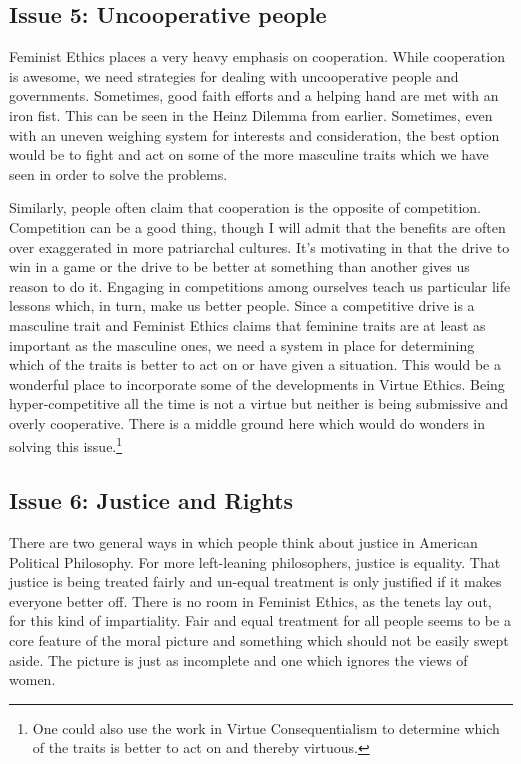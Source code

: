 \subsection{Issue 5: Uncooperative people}

Feminist Ethics places a very heavy emphasis on cooperation. While cooperation is awesome, we need strategies for dealing with uncooperative people and governments. Sometimes, good faith efforts and a helping hand are met with an iron fist. This can be seen in the Heinz Dilemma from earlier. Sometimes, even with an uneven weighing system for interests and consideration, the best option would be to fight and act on some of the more masculine traits which we have seen in order to solve the problems. 

Similarly, people often claim that cooperation is the opposite of competition. Competition can be a good thing, though I will admit that the benefits are often over exaggerated in more patriarchal cultures. It’s motivating in that the drive to win in a game or the drive to be better at something than another gives us reason to do it. Engaging in competitions among ourselves teach us particular life lessons which, in turn, make us better people. Since a competitive drive is a masculine trait and Feminist Ethics claims that feminine traits are at least as important as the masculine ones, we need a system in place for determining which of the traits is better to act on or have given a situation. This would be a wonderful place to incorporate some of the developments in Virtue Ethics. Being hyper-competitive all the time is not a virtue but neither is being submissive and overly cooperative. There is a middle ground here which would do wonders in solving this issue.\footnote{One could also use the work in Virtue Consequentialism to determine which of the traits is better to act on and thereby virtuous.}

\subsection{Issue 6: Justice and Rights}

There are two general ways in which people think about justice in American Political Philosophy. For more left-leaning philosophers, justice is equality. That justice is being treated fairly and un-equal treatment is only justified if it makes everyone better off. There is no room in Feminist Ethics, as the tenets lay out, for this kind of impartiality. Fair and equal treatment for all people seems to be a core feature of the moral picture and something which should not be easily swept aside. The picture is just as incomplete and one which ignores the views of women.


